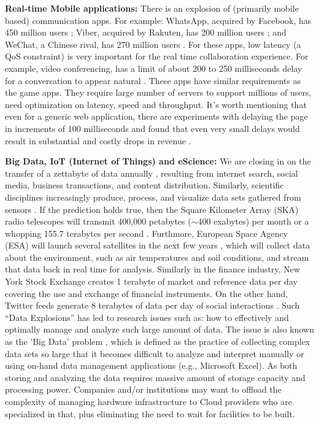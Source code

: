 \textbf{Real-time Mobile applications:} There is an explosion of
(primarily mobile based) communication apps. For example: WhatsApp, acquired by Facebook, has  450 million users \cite{ref7};
Viber, acquired by Rakuten, has 200 million users \cite{ref8};
and WeChat, a Chinese rival, has 270 million users \cite{ref9}.
For these apps, low latency (a QoS constraint) is very important for the real time collaboration experience. For example, video conferencing, has a limit of about 200 to 250 milliseconds delay for a conversation to appear natural \cite{weinman2011time}. These apps have similar requirements as the game apps. They require large number of servers to support millions of users, need optimization on latency, speed and throughput. It's worth mentioning that even for a generic web application, there are experiments with delaying the page in increments of 100 milliseconds and found that even very small delays would result in substantial and costly drops in revenue \cite{weinman2011time}.

\textbf{Big Data, IoT (Internet of Things) and eScience:} We are closing in on the transfer of a zettabyte of data annually \cite{ref11}, resulting from internet search, social media, business transactions, and content distribution. Similarly, scientific disciplines increasingly produce, process, and visualize data sets gathered from sensors \cite{GHadoop}. If the prediction holds true, then the Square Kilometer Array (SKA) radio telescopes will transmit 400,000 petabytes ($\sim$400 exabytes) per month or a whopping 155.7 terabytes per second \cite{ref12}. Furthmore, European Space Agency (ESA) will launch several satellites in the next few years \cite{ref13}, which will collect data about the environment, such as air temperatures and soil conditions, and stream that data back in real time for analysis.  Similarly in the finance industry, New York Stock Exchange creates 1 terabyte of market and reference data per day covering the use and exchange of financial instruments. On the other hand, Twitter feeds generate 8 terabytes of data per day of social interactions \cite{ref14}. Such ``Data Explosions'' has led to research issues such as: how to effectively and optimally manage and analyze such large amount of data. The issue is also known as the 'Big Data' problem \cite{hey2003data}, which is defined as the practice of collecting complex data sets so large that it becomes difficult to analyze and interpret manually or using on-hand data management applications (e.g., Microsoft Excel). As both storing and analyzing the data requires massive amount of storage capacity and processing power. Companies and/or institutions may want to offload the complexity of managing hardware infrastructure to Cloud providers who are specialized in that, plus eliminating the need to wait for facilities to be built.

